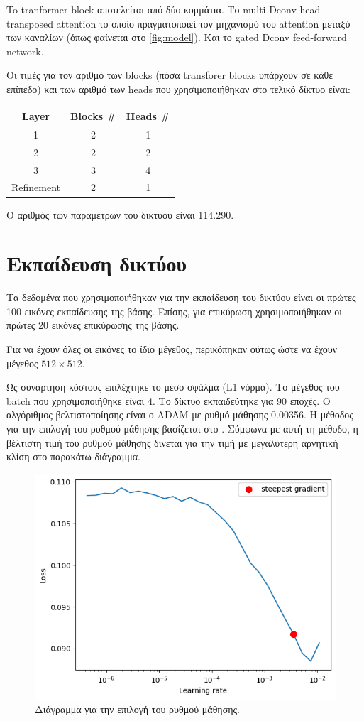 \documentclass[a4paper]{article}
\begin{document}
To tranformer block αποτελείται από δύο κομμάτια. Το multi Dconv head transposed
attention το οποίο πραγματοποιεί τον μηχανισμό του attention μεταξύ των
καναλίων (όπως φαίνεται στο \autoref{fig:model}). Και το gated Dconv
feed-forward network.

Οι τιμές για τον αριθμό των blocks (πόσα transforer blocks υπάρχουν σε κάθε
επίπεδο) και των αριθμό των heads που χρησιμοποιήθηκαν στο τελικό δίκτυο είναι:

\begin{center}
\begin{tabular}{|c|c|c|}
\hline
Layer & Blocks \# & Heads \# \\
\hline
\hline
1     & 2        & 1       \\ \hline
2     & 2        & 2       \\ \hline
3     & 3        & 4       \\ \hline
Refinement & 2   & 1       \\ \hline
\end{tabular}
\end{center}

Ο αριθμός των παραμέτρων του δικτύου είναι 114.290.

\section{Εκπαίδευση δικτύου}

Τα δεδομένα που χρησιμοποιήθηκαν για την εκπαίδευση του δικτύου είναι οι πρώτες
100 εικόνες εκπαίδευσης της βάσης. Επίσης, για επικύρωση χρησιμοποιήθηκαν οι
πρώτες 20 εικόνες επικύρωσης της βάσης.

Για να έχουν όλες οι εικόνες το ίδιο μέγεθος, περικόπηκαν ούτως ώστε να έχουν
μέγεθος $512 \times 512$.

Ως συνάρτηση κόστους επιλέχτηκε το μέσο σφάλμα (L1 νόρμα). Το μέγεθος του batch
που χρησιμοποιήθηκε είναι 4. Το δίκτυο εκπαιδεύτηκε για 90 εποχές. Ο αλγόριθμος
βελτιστοποίησης είναι ο ADAM με ρυθμό μάθησης 0.00356. Η μέθοδος για την επιλογή
του ρυθμού μάθησης βασίζεται στο \cite{lr}. Σύμφωνα με αυτή τη μέθοδο, η
βέλτιστη τιμή του ρυθμού μάθησης δίνεται για την τιμή με μεγαλύτερη αρνητική
κλίση στο παρακάτω διάγραμμα.

\begin{figure}[H]
    \centering

    \includegraphics[width=.5\linewidth]{SRTransformer6_lr_finder.png}

    \caption{Διάγραμμα για την επιλογή του ρυθμού μάθησης.}
\end{figure}
\end{document}
